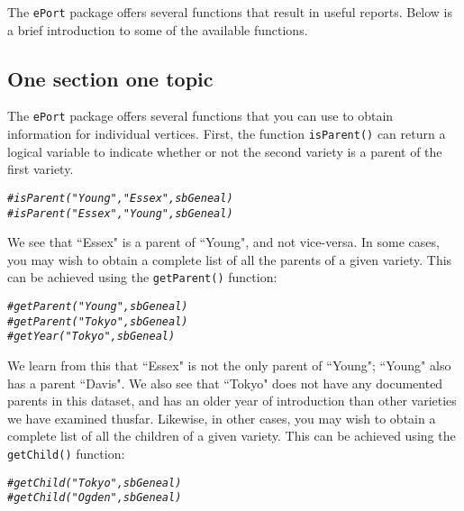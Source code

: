 \documentclass{article}\usepackage[]{graphicx}\usepackage[]{color}
\makeatletter
\newcommand{\hlcom}[1]{\textcolor[rgb]{0.678,0.584,0.686}{\textit{#1}}}%
\newenvironment{kframe}{%
 \def\at@end@of@kframe{}%
 \ifinner\ifhmode%
  \def\at@end@of@kframe{\end{minipage}}%
  \begin{minipage}{\columnwidth}%
 \fi\fi%
 \def\FrameCommand##1{\hskip\@totalleftmargin \hskip-\fboxsep
 \colorbox{shadecolor}{##1}\hskip-\fboxsep
     \hskip-\linewidth \hskip-\@totalleftmargin \hskip\columnwidth}%
 \MakeFramed {\advance\hsize-\width
   \@totalleftmargin\z@ \linewidth\hsize
   \@setminipage}}%
 {\par\unskip\endMakeFramed%
 \at@end@of@kframe}
\newenvironment{knitrout}{}{} %
\numberwithin{equation}{section} %
\newcommand{\pkg}[1]{{\texttt{#1}}}
\makeatother
\begin{document}
The \pkg{ePort} package offers several functions that result in useful reports. Below is a brief introduction to some of the available functions.

\subsection{One section one topic}

The \pkg{ePort} package offers several functions that you can use to obtain information for individual vertices. First, the function \texttt{isParent()} can return a logical variable to indicate whether or not the second variety is a parent of the first variety.

\begin{knitrout}
\color{fgcolor}\begin{kframe}
\begin{alltt}
\hlcom{#isParent("Young","Essex",sbGeneal)}
\hlcom{#isParent("Essex","Young",sbGeneal)}
\end{alltt}
\end{kframe}
\end{knitrout}

We see that ``Essex" is a parent of ``Young", and not vice-versa. In some cases, you may wish to obtain a complete list of all the parents of a given variety. This can be achieved using the \texttt{getParent()} function:

\begin{knitrout}
\color{fgcolor}\begin{kframe}
\begin{alltt}
\hlcom{#getParent("Young",sbGeneal)}
\hlcom{#getParent("Tokyo",sbGeneal)}
\hlcom{#getYear("Tokyo", sbGeneal)}
\end{alltt}
\end{kframe}
\end{knitrout}

We learn from this that ``Essex" is not the only parent of ``Young"; ``Young" also has a parent ``Davis". We also see that ``Tokyo" does not have any documented parents in this dataset, and has an older year of introduction than other varieties we have examined thusfar. Likewise, in other cases, you may wish to obtain a complete list of all the children of a given variety. This can be achieved using the \texttt{getChild()} function:

\begin{knitrout}
\color{fgcolor}\begin{kframe}
\begin{alltt}
\hlcom{#getChild("Tokyo",sbGeneal)}
\hlcom{#getChild("Ogden",sbGeneal)}
\end{alltt}
\end{kframe}
\end{knitrout}
\end{document}
